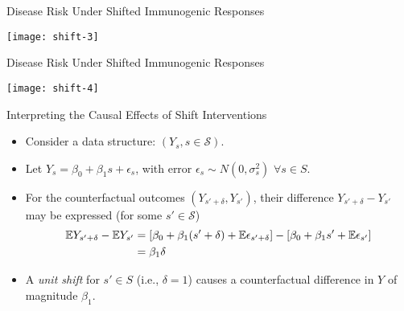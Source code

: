 \documentclass{beamer}
\begin{document}
\begin{frame}[c]{Disease Risk Under Shifted Immunogenic Responses}

\hspace*{-1cm}\texttt{[image: shift-3]}

\note{
}

\end{frame}


\begin{frame}[c]{Disease Risk Under Shifted Immunogenic Responses}

\hspace*{-1cm}\texttt{[image: shift-4]}

\note{
}

\end{frame}


\begin{frame}[c]{Interpreting the Causal Effects of Shift Interventions}

\begin{center}
\begin{itemize}
  \itemsep6pt
  \item Consider a data structure: $(Y_s, s \in \mathcal{S})$.
  \item Let $Y_s = \beta_0 + \beta_1 s + \epsilon_s$, with error $\epsilon_s
    \sim N(0, \sigma^2_s)$ $\forall s \in S$.
  \item For the counterfactual outcomes $(Y_{s' + \delta}, Y_{s'})$, their
    difference $Y_{s' + \delta} - Y_{s'}$ may be expressed (for some
    $s' \in \mathcal{S}$)
    \begin{align*}
      \mathbb{E} Y_{s' + \delta} - \mathbb{E} Y_{s'} &= [\beta_0 + \beta_1 (s' + \delta) +
          \mathbb{E} \epsilon_{s' + \delta}] - [\beta_0 + \beta_1 s' +
          \mathbb{E} \epsilon_{s'}] \\
        &= \beta_1 \delta
    \end{align*}
  \item A \textit{unit shift} for $s' \in S$ (i.e., $\delta = 1$) causes a
    counterfactual difference in $Y$ of magnitude $\beta_1$.
\end{itemize}
\end{center}


\end{frame}
\end{document}
